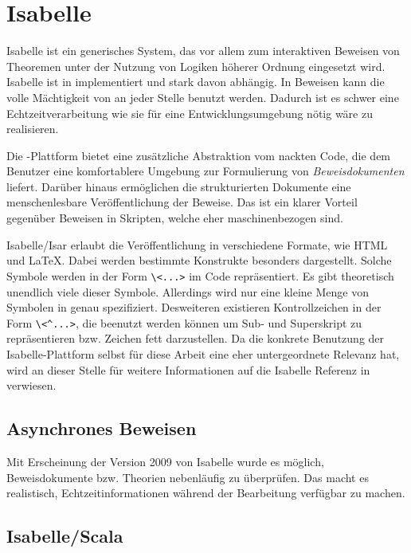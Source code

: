 \section{Isabelle}

Isabelle ist ein generisches System, das vor allem zum interaktiven Beweisen von Theoremen unter
der Nutzung von Logiken höherer Ordnung eingesetzt wird. Isabelle ist in  implementiert und
stark davon abhängig. In Beweisen kann die volle Mächtigkeit von  an jeder Stelle benutzt
werden. Dadurch ist es schwer eine Echtzeitverarbeitung wie sie für eine Entwicklungsumgebung nötig
wäre zu realisieren.

Die -Plattform bietet eine zusätzliche Abstraktion vom nackten  Code, die dem
Benutzer eine komfortablere Umgebung zur Formulierung von \textit{Beweisdokumenten} liefert. Darüber
hinaus ermöglichen die strukturierten Dokumente eine menschenlesbare Veröffentlichung der Beweise.
Das ist ein klarer Vorteil gegenüber Beweisen in  Skripten, welche eher maschinenbezogen
sind.

Isabelle/Isar erlaubt die Veröffentlichung in verschiedene Formate, wie HTML und LaTeX. Dabei werden
bestimmte Konstrukte besonders dargestellt. Solche Symbole werden in der Form
\texttt{\textbackslash\textless ...\textgreater} im Code repräsentiert. Es gibt theoretisch
unendlich viele dieser Symbole. Allerdings wird nur eine kleine Menge von Symbolen in
\cite{isabelle} genau spezifiziert. Desweiteren existieren Kontrollzeichen in der Form
\texttt{\textbackslash\textless\textasciicircum ...\textgreater}, die beenutzt werden können um
Sub- und Superskript zu repräsentieren bzw. Zeichen fett darzustellen. Da die konkrete Benutzung der
Isabelle-Plattform selbst für diese Arbeit eine eher untergeordnete Relevanz hat, wird an dieser
Stelle für weitere Informationen auf die Isabelle Referenz in \cite{isabelle} verwiesen.

\subsection{Asynchrones Beweisen}

Mit Erscheinung der Version 2009 von Isabelle wurde es möglich, Beweisdokumente bzw. Theorien
nebenläufig zu überprüfen. Das macht es realistisch, Echtzeitinformationen während der Bearbeitung
verfügbar zu machen. \cite{parproof}

\subsection{Isabelle/Scala}

